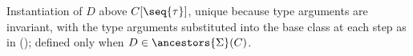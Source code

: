 Instantiation of $D$ above $C[\seq{\tau}]$, unique because type arguments are invariant, with the
type arguments substituted into the base class at each step as in  (); defined only
when $D \in \ancestors{\Sigma}(C)$.
